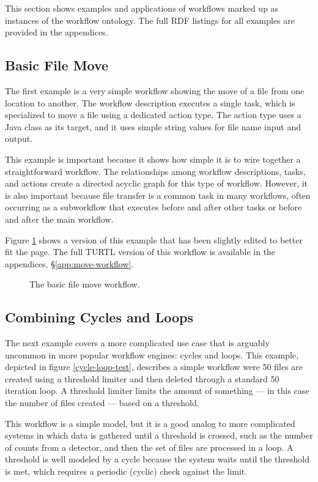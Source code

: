 This section shows examples and applications of workflows marked up as
instances of the workflow ontology. The full RDF listings for all
examples are provided in the appendices.

\subsection{Basic File Move}
\label{move-workflow}

The first example is a very simple workflow showing the move of a file from
one location to another. The workflow description executes a single task, which
is specialized to move a file using a dedicated action type. The action type
uses a Java class as its target, and it uses simple string values for file name
input and output.

This example is important because it shows how simple it is to wire together a
straightforward workflow. The relationships among workflow descriptions,
tasks, and actions create a directed acyclic graph for this type of workflow.
However, it is also important because file transfer is a common task in many
workflows, often occurring as a subworkflow that executes before and after
other tasks or before and after the main workflow.

Figure \ref{move-workflows} shows a version of this example that has been
slightly edited to better fit the page. The full TURTL version of this workflow
is available in the appendices, \S \ref{app:move-workflow}.

\begin{figure}[htbp]
\centering
{}
\caption{The basic file move workflow.}
\label{move-workflows}
\end{figure}

\subsection{Combining Cycles and Loops}

The next example covers a more complicated use case that is arguably uncommon
in more popular workflow engines: cycles and loops. This example, depicted in
figure \ref{cycle-loop-test}, describes a simple workflow were 50 files are
created using a threshold limiter and then deleted through a standard
50 iteration loop. A threshold limiter limits the amount of something --- in
this case the number of files created --- based on a threshold.

This workflow is a simple model, but it is a good analog to more complicated
systems in which data is gathered until a threshold is crossed, such as
the number of counts from a detector, and then the set of files are processed in a loop. A
threshold is well modeled by a cycle because the system waits until the
threshold is met, which requires a periodic (cyclic) check against the limit.

